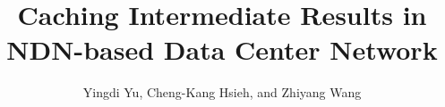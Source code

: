 \documentclass[journal]{IEEEtran}
\begin{document}
\title{Caching Intermediate Results in NDN-based Data Center Network}

\author{Yingdi Yu,
  Cheng-Kang Hsieh,
  and Zhiyang Wang}

\maketitle











\end{document}

